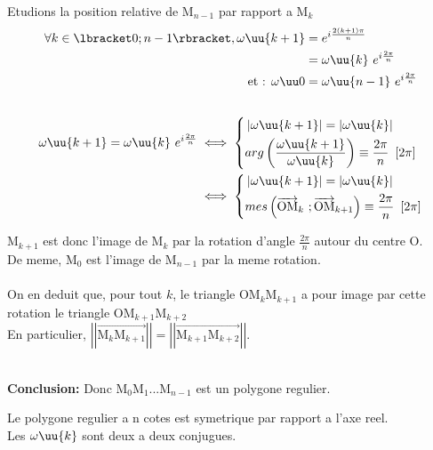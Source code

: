 \documentclass[12pt,a4paper]{article}
\begin{document}
			\begin{preuve}
				Etudions la position relative de M$_{n-1}$ par rapport a M$_k$
				$$\begin{aligned}
					\forall k\in\lbracket0;n-1\rbracket, \omega\uu{k+1}&=e^{i\frac{2(k+1)\pi}{n}} \\
					&=\omega\uu{k}\ e^{i\frac{2\pi}{n}} \\
					\text{et : }\omega\uu0&=\omega\uu{n-1}\ e^{i\frac{2\pi}{n}} \\\\
				\end{aligned}$$
				$$\begin{aligned}
					\omega\uu{k+1}=\omega\uu{k}\ e^{i\frac{2\pi}{n}}
					&\iff\left\{\begin{aligned}
						&\left|\omega\uu{k+1}\right|=\left|\omega\uu{k}\right| \\
						&arg\left(\frac{\omega\uu{k+1}}{\omega\uu{k}}\right)\equiv\frac{2\pi}{n}\ \left[2\pi\right]
					\end{aligned}\right.\\
					&\iff\left\{\begin{aligned}
						&\left|\omega\uu{k+1}\right|=\left|\omega\uu{k}\right| \\
						&mes\left(\overrightarrow{\text{OM}}_{k}\ ;\overrightarrow{\text{OM}}_{k+1}\right)\equiv\frac{2\pi}{n}\ \left[2\pi\right]
					\end{aligned}\right.
				\end{aligned}$$
				\begin{tab}
					M$_{k+1}$ est donc l'image de M$_k$ par la rotation d'angle $\frac{2\pi}{n}$ autour du centre O. \\
					De meme, M$_0$ est l'image de M$_{n-1}$ par la meme rotation. \\\\
					On en deduit que, pour tout $k$, le triangle OM$_k$M$_{k+1}$ a pour image par cette rotation le triangle OM$_{k+1}$M$_{k+2}$\\
					En particulier, $\left|\left|\overrightarrow{\text{M}_k\text{M}_{k+1}}\right|\right|=\left|\left|\overrightarrow{\text{M}_{k+1}\text{M}_{k+2}}\right|\right|$. \\\\
				\end{tab}
				\textbf{Conclusion:} Donc M$_0$M$_1$...M$_{n-1}$ est un polygone regulier.
			\end{preuve}
			\begin{prop}
				Le polygone regulier a n cotes est symetrique par rapport a l'axe reel.\\
				Les $\omega\uu{k}$ sont deux a deux conjugues.
			\end{prop}
\end{document}
